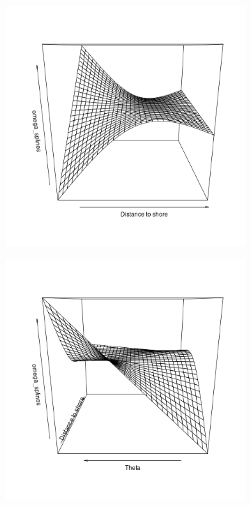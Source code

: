 \documentclass[11pt]{article}
\newcommand {\1}{\mathbb{1}}
\theoremstyle{definition}
\theoremstyle{remark}
\theoremstyle{remark}
\begin{document}
\begin{figure}[H]
	\begin{subfigure}{0.48\textwidth}
	\centering
	\includegraphics[scale=0.3]{images/crcvm/smooth_splines_omega1.png}
	\caption{}
	\label{fig: smoothomegasplines1}
	\end{subfigure}
	\begin{subfigure}{0.48\textwidth}
	\centering
	\includegraphics[scale=0.3]{images/crcvm/smooth_splines_omega2.png}

\end{subfigure}
\end{figure}
\end{document}
